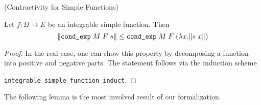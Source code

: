 \begin{lemma} (Contractivity for Simple Functions) \par
	Let $f : \Omega \rightarrow E$ be an integrable simple function. Then
	\[
		\normalfont\lVert \texttt{cond\_exp} \; M \; F \; s \rVert \le \texttt{cond\_exp} \; M \; F \; (\lambda x. \lVert s \; x \rVert)
	\]
\end{lemma}
\begin{proof}
	In the real case, one can show this property by decomposing a function into positive and negative parts. The statement follows via the induction scheme \par\noindent\texttt{integrable\_simple\_function\_induct}.
\end{proof}

The following lemma is the most involved result of our formalization.

